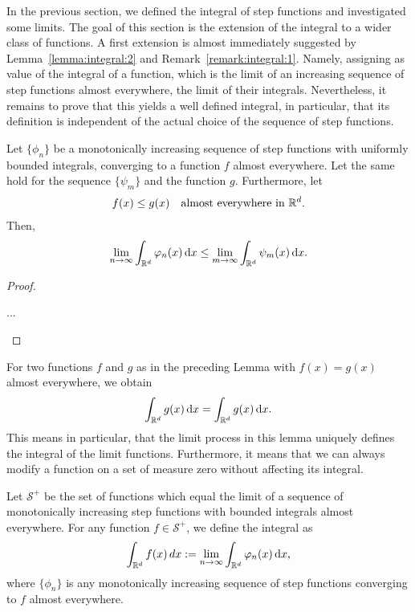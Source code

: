 \begin{intro}
  In the previous section, we defined the integral of step functions
  and investigated some limits. The goal of this section is the
  extension of the integral to a wider class of functions. A first
  extension is almost immediately suggested by
  Lemma~\ref{lemma:integral:2} and
  Remark~\ref{remark:integral:1}. Namely, assigning as value of the
  integral of a function, which is the limit of an increasing sequence
  of step functions almost everywhere, the limit of their
  integrals. Nevertheless, it remains to prove that this yields a well
  defined integral, in particular, that its definition is independent
  of the actual choice of the sequence of step functions.
\end{intro}

\begin{lemma}
  Let $\{\phi_n\}$ be a monotonically increasing sequence of step
  functions with uniformly bounded integrals, converging to a function
  $f$ almost everywhere. Let the same hold for the sequence
  $\{\psi_m\}$ and the function $g$. Furthermore, let
  \begin{gather*}
    f(x) \le g(x) \quad\text{almost everywhere in $\mathbb R^d$.}
  \end{gather*}
  Then,
  \begin{gather}
    \label{eq:integral:4}
    \lim_{n\to\infty} \int_{\mathbb R^d}\varphi_n(x)\,\mathrm{d} x
    \le
    \lim_{m\to\infty} \int_{\mathbb R^d}\psi_m(x)\,\mathrm{d} x.
  \end{gather}
\end{lemma}

\begin{proof}
  \begin{todo}
    ...
  \end{todo}
\end{proof}

\begin{corollary}
  For two functions $f$ and $g$ as in the preceding Lemma with $f(x) =
  g(x)$ almost everywhere, we obtain
  \begin{gather*}
    \int_{\mathbb R^d}g(x)\,\mathrm{d} x = \int_{\mathbb R^d}g(x)\,\mathrm{d} x.
  \end{gather*}
  This means in particular, that the limit process in this lemma
  uniquely defines the integral of the limit functions. Furthermore,
  it means that we can always modify a function on a set of measure
  zero without affecting its integral.
\end{corollary}

\begin{definition}
  Let $\mathcal S^+$ be the set of functions which equal the limit of
  a sequence of monotonically increasing step functions with bounded
  integrals almost everywhere. For any function $f\in \mathcal S^+$, we
  define the integral as
  \begin{gather*}
    \int_{\mathbb R^d} f(x) \,dx := \lim_{n\to\infty} \int_{\mathbb R^d}\varphi_n(x)\,\mathrm{d} x,
  \end{gather*}
  where $\{\phi_n\}$ is any monotonically increasing sequence of step
  functions converging to $f$ almost everywhere.
\end{definition}

